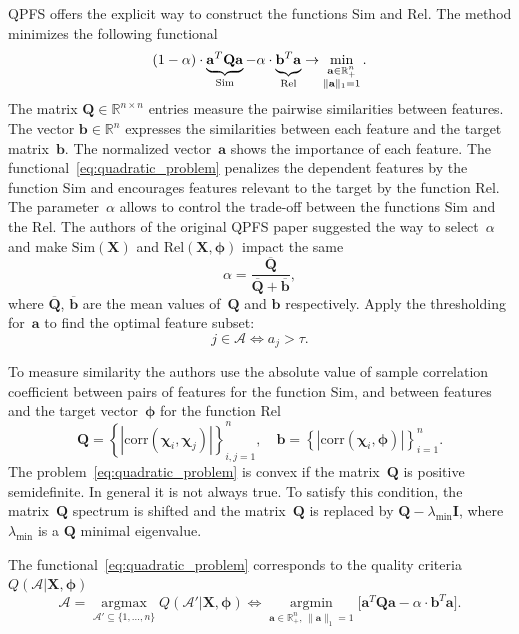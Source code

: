 \documentclass[12pt,twoside]{article}
\newcommand{\ba}{\mathbf{a}}
\newcommand{\bb}{\mathbf{b}}
\newcommand{\bX}{\mathbf{X}}
\newcommand{\bQ}{\mathbf{Q}}
\newcommand{\bbR}{\mathbb{R}}
\newcommand{\cA}{\mathcal{A}}
\newcommand{\bchi}{\boldsymbol{\chi}}
\newcommand{\bphi}{\boldsymbol{\phi}}
\newcommand{\argmin}{\mathop{\arg \min}\limits}
\newcommand{\argmax}{\mathop{\arg \max}\limits}
\begin{document}
QPFS offers the explicit way to construct the functions Sim and Rel. 
The method minimizes the following functional
\begin{equation}
	(1 - \alpha) \cdot \underbrace{\ba^{T} \bQ \ba}_{\text{Sim}} - \alpha \cdot \underbrace{\vphantom{()} \mathbf{b}^{T} \ba}_{\text{Rel}} \rightarrow \min_{\substack{\ba \in \bbR^n_+ \\ \|\ba\|_1=1}}.
	\label{eq:quadratic_problem}
\end{equation}
The matrix $\bQ \in \bbR^{n \times n}$ entries measure the pairwise similarities between features. 
The vector $\mathbf{b} \in \bbR^n$ expresses the similarities between each feature and the target matrix~$\bb$.
The normalized vector~$\ba$ shows the importance of each feature. 
The functional~\eqref{eq:quadratic_problem} penalizes the dependent features by the function Sim and encourages features relevant to the target by the function Rel. 
The parameter~$\alpha$ allows to control the trade-off between the functions Sim and the Rel.
The authors of the original QPFS paper suggested the way to select~$\alpha$ and make $\text{Sim}(\bX)$ and $\text{Rel}(\bX, \bphi)$ impact the same
\begin{equation*}
	\alpha = \frac{\overline{\bQ}}{\overline{\bQ} + \overline{\bb}},
\end{equation*}
where $\overline{\bQ}$, $\overline{\bb}$ are the mean values of~$\bQ$ and $\bb$ respectively.
Apply the thresholding for~$\ba$ to find the optimal feature subset:
\[
	j \in \mathcal{A} \Leftrightarrow a_j > \tau.
\]

To measure similarity the authors use the absolute value of sample correlation coefficient between pairs of features for the function Sim, and between features and the target vector~$\bphi$ for the function Rel
\begin{equation}
	\bQ = \left\{\left|\text{corr}(\bchi_i, \bchi_j)\right|\right\}_{i,j=1}^n, \quad \bb = \left\{\left|\text{corr}(\bchi_i, \bphi)\right|\right\}_{i=1}^n.
	\label{eq:qpfs_1d_qb}
\end{equation}
The problem~\eqref{eq:quadratic_problem} is convex if the matrix~$\bQ$ is positive semidefinite. In general it is not always true. 
To satisfy this condition, the matrix~$\bQ$ spectrum is shifted and the matrix~$\bQ$ is replaced by $\bQ - \lambda_{\text{min}} \mathbf{I}$, where $\lambda_{\text{min}} $ is a $\bQ$ minimal eigenvalue.

The functional~\eqref{eq:quadratic_problem} corresponds to the quality criteria~$Q(\cA | \bX, \bphi)$
\begin{equation}
\cA = \argmax_{\cA' \subseteq \{1, \dots, n\}} Q(\cA' | \bX, \bphi) \Leftrightarrow \argmin_{\ba  \in \bbR^n_+, \, \|\ba\|_1=1} \bigl[\ba^{T} \bQ \ba - \alpha \cdot \mathbf{b}^{T} \ba \bigr].
\end{equation}
\end{document}
